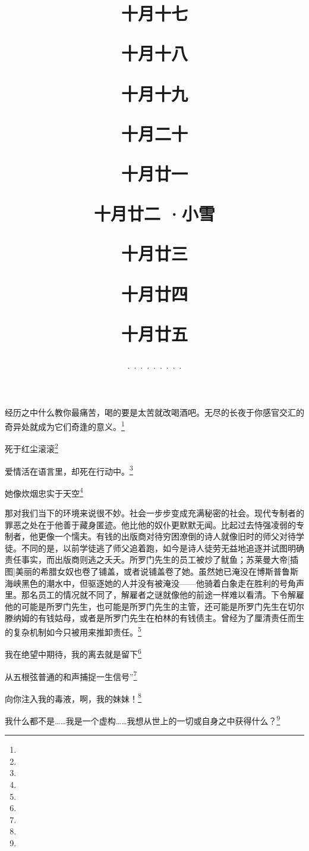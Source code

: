 \title{\date[d=17,m=11,y=2024][year:cn-y,年,month:cn,day:cn,日,·,weekday]·十月十七 }
经历之中什么教你最痛苦，喝的要是太苦就改喝酒吧。无尽的长夜于你感官交汇的奇异处就成为它们奇逢的意义。\footnote{ }

\title{\date[d=18,m=11,y=2024][year:cn-y,年,month:cn,day:cn,日,·,weekday]·十月十八 }
死于红尘滚滚\footnote{ }

\title{\date[d=19,m=11,y=2024][year:cn-y,年,month:cn,day:cn,日,·,weekday]·十月十九 }
爱情活在语言里，却死在行动中。\footnote{ }

\title{\date[d=20,m=11,y=2024][year:cn-y,年,month:cn,day:cn,日,·,weekday]·十月二十 }
她像炊烟忠实于天空\footnote{ }

\title{\date[d=21,m=11,y=2024][year:cn-y,年,month:cn,day:cn,日,·,weekday]·十月廿一 }
那对我们当下的环境来说很不妙。社会一步步变成充满秘密的社会。现代专制者的罪恶之处在于他善于藏身匿迹。他比他的奴仆更默默无闻。比起过去恃强凌弱的专制者，他更像一个懦夫。有钱的出版商对待穷困潦倒的诗人就像旧时的师父对待学徒。不同的是，以前学徒逃了师父追着跑，如今是诗人徒劳无益地追逐并试图明确责任事实，而出版商则逃之夭夭。所罗门先生的员工被炒了鱿鱼；苏莱曼大帝[插图]美丽的希腊女奴也卷了铺盖，或者说铺盖卷了她。虽然她已淹没在博斯普鲁斯海峡黑色的潮水中，但驱逐她的人并没有被淹没——他骑着白象走在胜利的号角声里。那名员工的情况就不同了，解雇者之谜就像他的前途一样难以看清。下令解雇他的可能是所罗门先生，也可能是所罗门先生的主管，还可能是所罗门先生在切尔滕纳姆的有钱姑母，或者是所罗门先生在柏林的有钱债主。曾经为了厘清责任而生的复杂机制如今只被用来推卸责任。\footnote{ }

\title{\date[d=22,m=11,y=2024][year:cn-y,年,month:cn,day:cn,日,·,weekday]·十月廿二 ·小雪}
我在绝望中期待，我的离去就是留下\footnote{ }

\title{\date[d=23,m=11,y=2024][year:cn-y,年,month:cn,day:cn,日,·,weekday]·十月廿三 }
从五根弦普通的和声捕捉一生信号”\footnote{ }

\title{\date[d=24,m=11,y=2024][year:cn-y,年,month:cn,day:cn,日,·,weekday]·十月廿四 }
向你注入我的毒液，啊，我的妹妹！\footnote{ }

\title{\date[d=25,m=11,y=2024][year:cn-y,年,month:cn,day:cn,日,·,weekday]·十月廿五 }
我什么都不是……我是一个虚构……我想从世上的一切或自身之中获得什么？\footnote{ }

